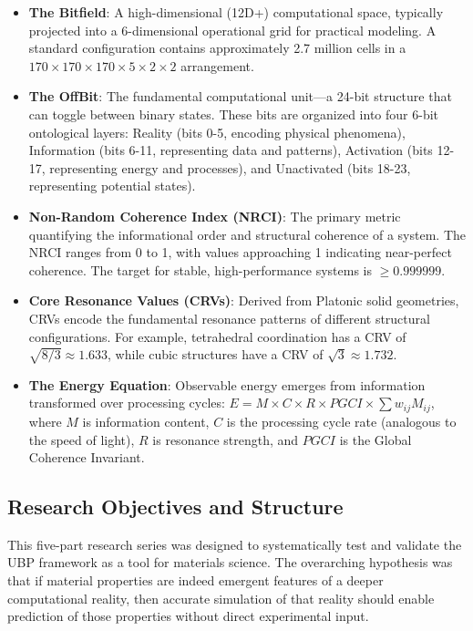 \documentclass[11pt,a4paper]{article}
\begin{document}
\begin{itemize}
    \item \textbf{The Bitfield}: A high-dimensional (12D+) computational space, typically projected into a 6-dimensional operational grid for practical modeling. A standard configuration contains approximately 2.7 million cells in a $170 \times 170 \times 170 \times 5 \times 2 \times 2$ arrangement.
    
    \item \textbf{The OffBit}: The fundamental computational unit—a 24-bit structure that can toggle between binary states. These bits are organized into four 6-bit ontological layers: Reality (bits 0-5, encoding physical phenomena), Information (bits 6-11, representing data and patterns), Activation (bits 12-17, representing energy and processes), and Unactivated (bits 18-23, representing potential states).
    
    \item \textbf{Non-Random Coherence Index (NRCI)}: The primary metric quantifying the informational order and structural coherence of a system. The NRCI ranges from 0 to 1, with values approaching 1 indicating near-perfect coherence. The target for stable, high-performance systems is $\geq 0.999999$.
    
    \item \textbf{Core Resonance Values (CRVs)}: Derived from Platonic solid geometries, CRVs encode the fundamental resonance patterns of different structural configurations. For example, tetrahedral coordination has a CRV of $\sqrt{8/3} \approx 1.633$, while cubic structures have a CRV of $\sqrt{3} \approx 1.732$.
    
    \item \textbf{The Energy Equation}: Observable energy emerges from information transformed over processing cycles: $E = M \times C \times R \times PGCI \times \sum w_{ij} M_{ij}$, where $M$ is information content, $C$ is the processing cycle rate (analogous to the speed of light), $R$ is resonance strength, and $PGCI$ is the Global Coherence Invariant.
\end{itemize}

\subsection{Research Objectives and Structure}

This five-part research series was designed to systematically test and validate the UBP framework as a tool for materials science. The overarching hypothesis was that if material properties are indeed emergent features of a deeper computational reality, then accurate simulation of that reality should enable prediction of those properties without direct experimental input.
\end{document}
